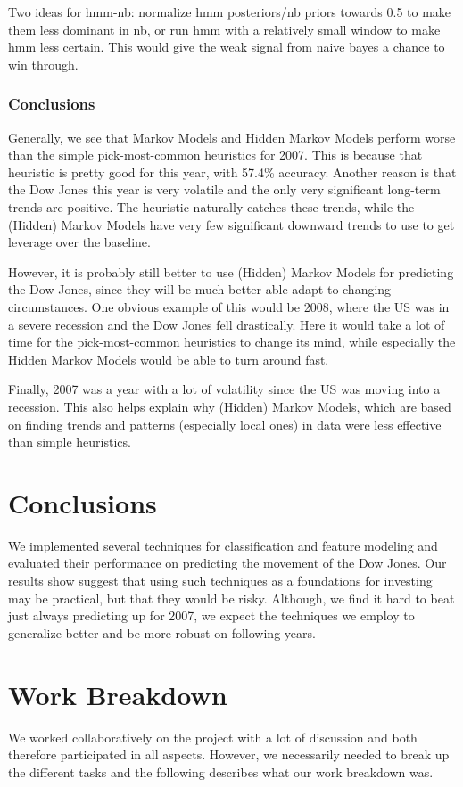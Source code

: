 \documentclass[10pt, twocolumn]{article}
\begin{document}
Two ideas for hmm-nb: normalize hmm posteriors/nb priors towards 0.5 to make them less dominant in nb, or run hmm with a relatively small window to make hmm less certain. This would give the weak signal from naive bayes a chance to win through.


\subsubsection{Conclusions}

Generally, we see that Markov Models and Hidden Markov Models perform worse than the simple pick-most-common heuristics for 2007. This is because that heuristic is pretty good for this year, with 57.4\% accuracy. Another reason is that the Dow Jones this year is very volatile and the only very significant long-term trends are positive. The heuristic naturally catches these trends, while the (Hidden) Markov Models have very few significant downward trends to use to get leverage over the baseline.

However, it is probably still better to use (Hidden) Markov Models for predicting the Dow Jones, since they will be much better able adapt to changing circumstances.
One obvious example of this would be 2008, where the US was in a severe recession and the Dow Jones fell drastically.
Here it would take a lot of time for the pick-most-common heuristics to change its mind, while especially the Hidden Markov Models would be able to turn around fast.

Finally, 2007 was a year with a lot of volatility since the US was moving into a recession.
This also helps explain why (Hidden) Markov Models, which are based on finding trends and patterns (especially local ones) in data were less effective than simple heuristics.

\section{Conclusions}
We implemented several techniques for classification and feature modeling and evaluated their performance on predicting the movement of the Dow Jones.
Our results show suggest that using such techniques as a foundations for investing may be practical, but that they would be risky.
Although, we find it hard to beat just always predicting up for 2007, we expect the techniques we employ to generalize better and be more robust on following years. 

\appendix

\section{Work Breakdown}
We worked collaboratively on the project with a lot of discussion and both therefore participated in all aspects.
However, we necessarily needed to break up the different tasks and the following describes what our work breakdown was.
\end{document}
